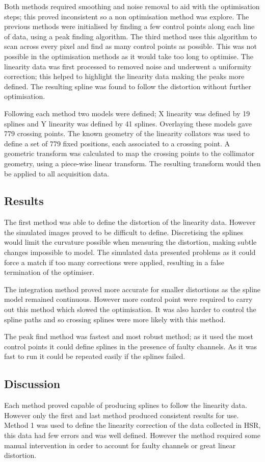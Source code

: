 Both methods required smoothing and noise removal to aid with the optimisation steps; this proved inconsistent so a non optimisation method was explore. The previous methods were initialised by finding a few control points along each line of data, using a peak finding algorithm. The third method uses this algorithm to scan across every pixel and find as many control points as possible. This was not possible in the optimisation methods as it would take too long to optimise. The linearity data was first processed to removed noise and underwent a uniformity correction; this helped to highlight the linearity data making the peaks more defined. The resulting spline was found to follow the distortion without further optimisation. 

Following each method two models were defined; X linearity was defined by 19 splines and Y linearity was defined by 41 splines. Overlaying these models gave 779 crossing points. The known geometry of the linearity collators was used to define a set of 779 fixed positions, each associated to a crossing point. A geometric transform was calculated to map the crossing points to the collimator geometry, using a piece-wise linear transform. The resulting transform would then be applied to all acquisition data.

\subsection{Results}
The first method was able to define the distortion of the linearity data. However the simulated images proved to be difficult to define. Discretising the splines would limit the curvature possible when measuring the distortion, making subtle changes impossible to model. The simulated data presented problems as it could force a match if too many corrections were applied, resulting in a false termination of the optimiser.

The integration method proved more accurate for smaller distortions as the spline model remained continuous. However more control point were required to carry out this method which slowed the optimisation. It was also harder to control the spline paths and so crossing splines were more likely with this method. 

The peak find method was fastest and most robust method; as it used the most control points it could define splines in the presence of faulty channels. As it was fast to run it could be repeated easily if the splines failed. 
\subsection{Discussion}
Each method proved capable of producing splines to follow the linearity data. However only the first and last method produced consistent results for use. Method 1 was used to define the linearity correction of the data collected in \acrshort{HSR}, this data had few errors and was well defined. However the method required some manual intervention in order to account for faulty channels or great linear distortion. 

